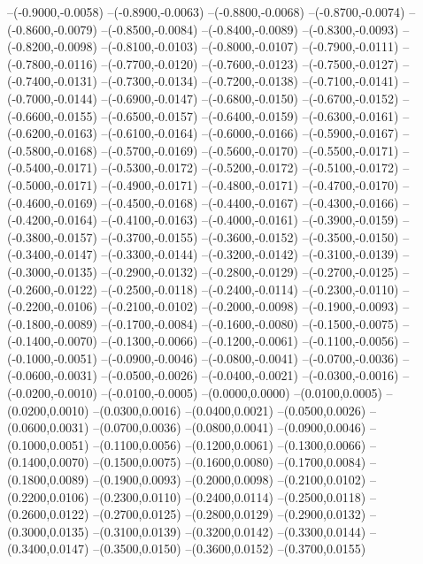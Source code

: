 	--(-0.9000,-0.0058)
	--(-0.8900,-0.0063)
	--(-0.8800,-0.0068)
	--(-0.8700,-0.0074)
	--(-0.8600,-0.0079)
	--(-0.8500,-0.0084)
	--(-0.8400,-0.0089)
	--(-0.8300,-0.0093)
	--(-0.8200,-0.0098)
	--(-0.8100,-0.0103)
	--(-0.8000,-0.0107)
	--(-0.7900,-0.0111)
	--(-0.7800,-0.0116)
	--(-0.7700,-0.0120)
	--(-0.7600,-0.0123)
	--(-0.7500,-0.0127)
	--(-0.7400,-0.0131)
	--(-0.7300,-0.0134)
	--(-0.7200,-0.0138)
	--(-0.7100,-0.0141)
	--(-0.7000,-0.0144)
	--(-0.6900,-0.0147)
	--(-0.6800,-0.0150)
	--(-0.6700,-0.0152)
	--(-0.6600,-0.0155)
	--(-0.6500,-0.0157)
	--(-0.6400,-0.0159)
	--(-0.6300,-0.0161)
	--(-0.6200,-0.0163)
	--(-0.6100,-0.0164)
	--(-0.6000,-0.0166)
	--(-0.5900,-0.0167)
	--(-0.5800,-0.0168)
	--(-0.5700,-0.0169)
	--(-0.5600,-0.0170)
	--(-0.5500,-0.0171)
	--(-0.5400,-0.0171)
	--(-0.5300,-0.0172)
	--(-0.5200,-0.0172)
	--(-0.5100,-0.0172)
	--(-0.5000,-0.0171)
	--(-0.4900,-0.0171)
	--(-0.4800,-0.0171)
	--(-0.4700,-0.0170)
	--(-0.4600,-0.0169)
	--(-0.4500,-0.0168)
	--(-0.4400,-0.0167)
	--(-0.4300,-0.0166)
	--(-0.4200,-0.0164)
	--(-0.4100,-0.0163)
	--(-0.4000,-0.0161)
	--(-0.3900,-0.0159)
	--(-0.3800,-0.0157)
	--(-0.3700,-0.0155)
	--(-0.3600,-0.0152)
	--(-0.3500,-0.0150)
	--(-0.3400,-0.0147)
	--(-0.3300,-0.0144)
	--(-0.3200,-0.0142)
	--(-0.3100,-0.0139)
	--(-0.3000,-0.0135)
	--(-0.2900,-0.0132)
	--(-0.2800,-0.0129)
	--(-0.2700,-0.0125)
	--(-0.2600,-0.0122)
	--(-0.2500,-0.0118)
	--(-0.2400,-0.0114)
	--(-0.2300,-0.0110)
	--(-0.2200,-0.0106)
	--(-0.2100,-0.0102)
	--(-0.2000,-0.0098)
	--(-0.1900,-0.0093)
	--(-0.1800,-0.0089)
	--(-0.1700,-0.0084)
	--(-0.1600,-0.0080)
	--(-0.1500,-0.0075)
	--(-0.1400,-0.0070)
	--(-0.1300,-0.0066)
	--(-0.1200,-0.0061)
	--(-0.1100,-0.0056)
	--(-0.1000,-0.0051)
	--(-0.0900,-0.0046)
	--(-0.0800,-0.0041)
	--(-0.0700,-0.0036)
	--(-0.0600,-0.0031)
	--(-0.0500,-0.0026)
	--(-0.0400,-0.0021)
	--(-0.0300,-0.0016)
	--(-0.0200,-0.0010)
	--(-0.0100,-0.0005)
	--(0.0000,0.0000)
	--(0.0100,0.0005)
	--(0.0200,0.0010)
	--(0.0300,0.0016)
	--(0.0400,0.0021)
	--(0.0500,0.0026)
	--(0.0600,0.0031)
	--(0.0700,0.0036)
	--(0.0800,0.0041)
	--(0.0900,0.0046)
	--(0.1000,0.0051)
	--(0.1100,0.0056)
	--(0.1200,0.0061)
	--(0.1300,0.0066)
	--(0.1400,0.0070)
	--(0.1500,0.0075)
	--(0.1600,0.0080)
	--(0.1700,0.0084)
	--(0.1800,0.0089)
	--(0.1900,0.0093)
	--(0.2000,0.0098)
	--(0.2100,0.0102)
	--(0.2200,0.0106)
	--(0.2300,0.0110)
	--(0.2400,0.0114)
	--(0.2500,0.0118)
	--(0.2600,0.0122)
	--(0.2700,0.0125)
	--(0.2800,0.0129)
	--(0.2900,0.0132)
	--(0.3000,0.0135)
	--(0.3100,0.0139)
	--(0.3200,0.0142)
	--(0.3300,0.0144)
	--(0.3400,0.0147)
	--(0.3500,0.0150)
	--(0.3600,0.0152)
	--(0.3700,0.0155)
